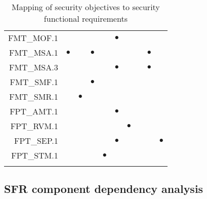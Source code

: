 \documentclass[12pt,english]{scrbook}
\newcommand{\oh}{$\bullet$}
\begin{document}
\begin{longtable}{r|R|R|R|R|R|R|R|R|R|}
FMT\_MOF.1                  &      &          &    &         &  \oh      &          &             &              &              \\
FMT\_MSA.1                  & \oh  &          & \oh          &           &          &          &             & \oh         &              \\
FMT\_MSA.3                  &      &          &            &         & \oh       &          &             &  \oh         &              \\
FMT\_SMF.1                  &      &          & \oh         &         &           &          &             &              &              \\
FMT\_SMR.1                  &      & \oh      &            &         &           &          &             &              &              \\
FPT\_AMT.1                  &      &          &            &         & \oh       &          &             &              &              \\
FPT\_RVM.1                  &      &          &            &         &           &  \oh     &             &              &              \\
FPT\_SEP.1                  &      &          &            &         &   \oh     &          &             &              &   \oh        \\
FPT\_STM.1                  &      &          &            &  \oh    &           &          &             &              &              \\
 \bottomrule
 \caption{Mapping of security objectives to security functional requirements}
\end{longtable}

\subsection{SFR component dependency analysis}
\end{document}
